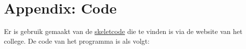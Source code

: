 \documentclass[10pt]{article}
\begin{document}



\section*{Appendix: Code}

Er is gebruik gemaakt van de \href{http://www.liacs.leidenuniv.nl/~kosterswa/AI/iets.cc}{\underline{skeletcode}} die te vinden is via
de website van het college.
De code van het programma is als volgt:

\smallskip


\end{document}
